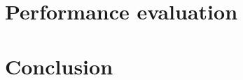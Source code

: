 \documentclass[10pt,conference,compsocconf]{IEEEtran}
\begin{document}
\section{Performance evaluation}


\section{Conclusion}




\end{document}
